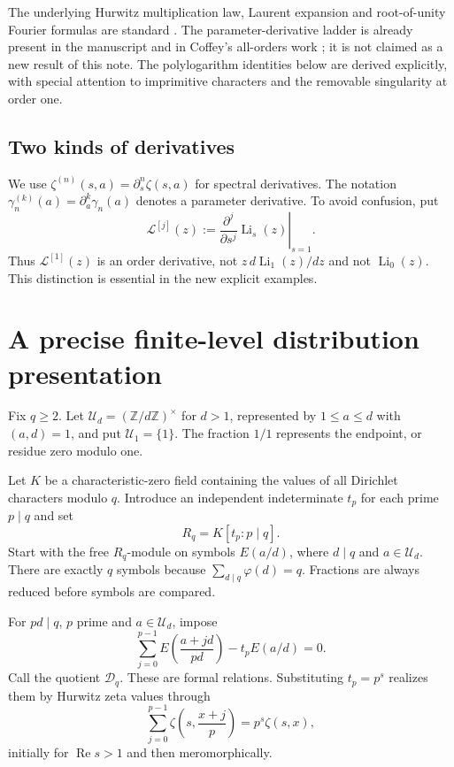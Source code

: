 \documentclass[11pt]{article}
\numberwithin{equation}{section}
\theoremstyle{definition}\newtheorem{definition}[theorem]{Definition}
\theoremstyle{remark}\newtheorem{remark}[theorem]{Remark}
\DeclareMathOperator{\Li}{Li}
\DeclareMathOperator{\Rea}{Re}
\newcommand{\Z}{\mathbb Z}\newcommand{\U}{\mathcal U}
\newcommand{\Liord}[2]{\mathcal L^{[#1]}(#2)}
\begin{document}
The underlying Hurwitz multiplication law, Laurent expansion and
root-of-unity Fourier formulas are standard \cite{dlmfhurwitz,dlmfpolylog}.
The parameter-derivative ladder is already present in the manuscript and
in Coffey's all-orders work \cite{coffey}; it is not claimed as a new result
of this note. The polylogarithm identities below are derived explicitly,
with special attention to imprimitive characters and the removable
singularity at order one.

\subsection{Two kinds of derivatives}

We use $\zeta^{(n)}(s,a)=\partial_s^n\zeta(s,a)$ for spectral derivatives.
The notation $\gamma_n^{(k)}(a)=\partial_a^k\gamma_n(a)$ denotes a parameter
derivative. To avoid confusion, put
\begin{equation}\label{eq:orderjet}
\Liord{j}{z}:=\left.\frac{\partial^j}{\partial s^j}\Li_s(z)\right|_{s=1}.
\end{equation}
Thus $\Liord{1}{z}$ is an order derivative, not $z\,d\Li_1(z)/dz$ and not
$\Li_0(z)$. This distinction is essential in the new explicit examples.

\section{A precise finite-level distribution presentation}

Fix $q\ge2$. Let $\U_d=(\Z/d\Z)^\times$ for $d>1$, represented by
$1\le a\le d$ with $(a,d)=1$, and put $\U_1=\{1\}$. The fraction $1/1$
represents the endpoint, or residue zero modulo one.

Let $K$ be a characteristic-zero field containing the values of all
Dirichlet characters modulo $q$. Introduce an independent indeterminate
$t_p$ for each prime $p\mid q$ and set
\[
R_q=K[t_p:p\mid q].
\]
Start with the free $R_q$-module on symbols $E(a/d)$, where $d\mid q$ and
$a\in\U_d$. There are exactly $q$ symbols because
$\sum_{d\mid q}\varphi(d)=q$. Fractions are always reduced before symbols
are compared.

For $pd\mid q$, $p$ prime and $a\in\U_d$, impose
\begin{equation}\label{eq:prime-row}
\sum_{j=0}^{p-1}E\!\left(\frac{a+jd}{pd}\right)-t_p E(a/d)=0.
\end{equation}
Call the quotient $\mathscr D_q$. These are formal relations. Substituting
$t_p=p^s$ realizes them by Hurwitz zeta values through
\[
\sum_{j=0}^{p-1}\zeta\!\left(s,\frac{x+j}{p}\right)=p^s\zeta(s,x),
\]
initially for $\Rea s>1$ and then meromorphically.
\end{document}
